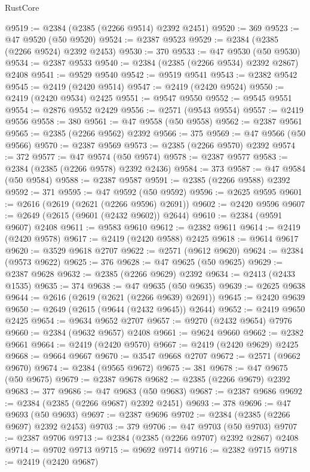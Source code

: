 \begin{lexlean}{RustCore}
\begin{coremodule}
@9519 := @2384 (@2385 (@2266 @9514) @2392 @2451)
@9520 := 369
@9523 := @47 @9520 (@50 @9520)
@9524 := @2387 @9523
@9529 := @2384 (@2385 (@2266 @9524) @2392 @2453)
@9530 := 370
@9533 := @47 @9530 (@50 @9530)
@9534 := @2387 @9533
@9540 := @2384 (@2385 (@2266 @9534) @2392 @2867) @2408
@9541 := @9529 @9540
@9542 := @9519 @9541
@9543 := @2382 @9542
@9545 := @2419 (@2420 @9514)
@9547 := @2419 (@2420 @9524)
@9550 := @2419 (@2420 @9534) @2425
@9551 := @9547 @9550
@9552 := @9545 @9551
@9554 := @2876 @9552 @2429
@9556 := @2571 (@9543 @9554)
@9557 := @2419 @9556
@9558 := 380
@9561 := @47 @9558 (@50 @9558)
@9562 := @2387 @9561
@9565 := @2385 (@2266 @9562) @2392
@9566 := 375
@9569 := @47 @9566 (@50 @9566)
@9570 := @2387 @9569
@9573 := @2385 (@2266 @9570) @2392
@9574 := 372
@9577 := @47 @9574 (@50 @9574)
@9578 := @2387 @9577
@9583 := @2384 (@2385 (@2266 @9578) @2392 @2436)
@9584 := 373
@9587 := @47 @9584 (@50 @9584)
@9588 := @2387 @9587
@9591 := @2385 (@2266 @9588) @2392
@9592 := 371
@9595 := @47 @9592 (@50 @9592)
@9596 := @2625 @9595
@9601 := @2616 (@2619 (@2621 (@2266 @9596) @2691))
@9602 := @2420 @9596
@9607 := @2649 (@2615 (@9601 (@2432 @9602)) @2644)
@9610 := @2384 (@9591 @9607) @2408
@9611 := @9583 @9610
@9612 := @2382 @9611
@9614 := @2419 (@2420 @9578)
@9617 := @2419 (@2420 @9588) @2425
@9618 := @9614 @9617
@9620 := @3529 @9618 @2707
@9622 := @2571 (@9612 @9620)
@9624 := @2384 (@9573 @9622)
@9625 := 376
@9628 := @47 @9625 (@50 @9625)
@9629 := @2387 @9628
@9632 := @2385 (@2266 @9629) @2392
@9634 := @2413 (@2433 @1535)
@9635 := 374
@9638 := @47 @9635 (@50 @9635)
@9639 := @2625 @9638
@9644 := @2616 (@2619 (@2621 (@2266 @9639) @2691))
@9645 := @2420 @9639
@9650 := @2649 (@2615 (@9644 (@2432 @9645)) @2644)
@9652 := @2419 @9650 @2425
@9654 := @9634 @9652 @2707
@9657 := @9270 (@2432 @9654) @7976
@9660 := @2384 (@9632 @9657) @2408
@9661 := @9624 @9660
@9662 := @2382 @9661
@9664 := @2419 (@2420 @9570)
@9667 := @2419 (@2420 @9629) @2425
@9668 := @9664 @9667
@9670 := @3547 @9668 @2707
@9672 := @2571 (@9662 @9670)
@9674 := @2384 (@9565 @9672)
@9675 := 381
@9678 := @47 @9675 (@50 @9675)
@9679 := @2387 @9678
@9682 := @2385 (@2266 @9679) @2392
@9683 := 377
@9686 := @47 @9683 (@50 @9683)
@9687 := @2387 @9686
@9692 := @2384 (@2385 (@2266 @9687) @2392 @2451)
@9693 := 378
@9696 := @47 @9693 (@50 @9693)
@9697 := @2387 @9696
@9702 := @2384 (@2385 (@2266 @9697) @2392 @2453)
@9703 := 379
@9706 := @47 @9703 (@50 @9703)
@9707 := @2387 @9706
@9713 := @2384 (@2385 (@2266 @9707) @2392 @2867) @2408
@9714 := @9702 @9713
@9715 := @9692 @9714
@9716 := @2382 @9715
@9718 := @2419 (@2420 @9687)

\end{coremodule}
\end{lexlean}
